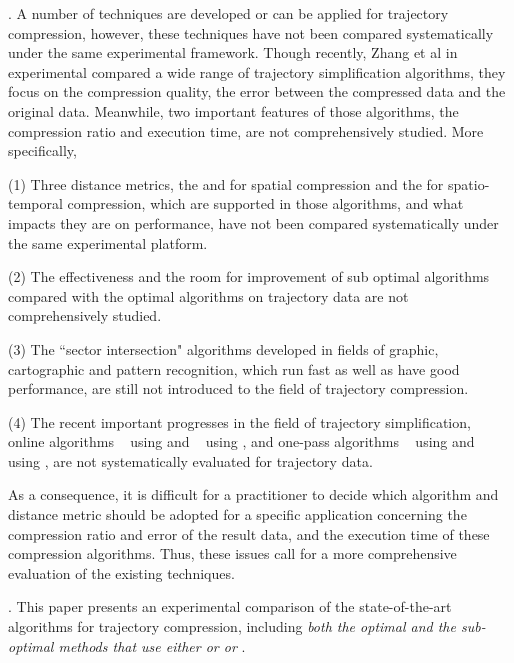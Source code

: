 . A number of techniques are developed or can be applied for trajectory compression, however, these techniques have not been compared systematically under the same experimental framework.
Though recently, Zhang et al in \cite{Zhang:Evaluation} experimental compared a wide range of trajectory simplification algorithms, they focus on the compression quality, \ie the error between the compressed data and the original data. Meanwhile, two important features of those algorithms, \ie the compression ratio and execution time, are not comprehensively studied. %
More specifically,

\ni (1) Three distance metrics, \ie the \ped and \dad for spatial compression and the \sed \cite{Meratnia:Spatiotemporal} for spatio-temporal compression, which are supported in those algorithms, and what impacts they are on performance, have not been compared systematically under the same experimental platform.

\ni (2) The effectiveness and the room for improvement of sub optimal \lsa algorithms compared with the optimal \lsa algorithms on trajectory data are not comprehensively studied.

\ni (3) The ``sector intersection" algorithms \cite{Williams:Longest, Sklansky:Cone, Dunham:Cone, Zhao:Sleeve} developed in fields of graphic, cartographic and pattern recognition, which run fast as well as have good performance, are still not introduced to the field of trajectory compression.

\ni (4) The recent important progresses in the field of trajectory simplification, \ie online algorithms \squishe~\cite{Muckell:Compression} using \sed and \bqsa~\cite{Liu:BQS} using \ped, and one-pass algorithms \operb~\cite{Lin:Operb} using \ped and \cised~\cite{Lin:Cised} using \sed, are not systematically evaluated for trajectory data.


As a consequence, it is difficult for a practitioner to decide which algorithm and distance metric should be adopted for a specific application concerning the compression ratio and error of the result data, and the execution time of these compression algorithms.
%
Thus, these issues call for a more comprehensive evaluation of the existing \lsa techniques. %

\stitle{\textcolor{blue}{Contributions}}.
This paper presents an experimental comparison of the state-of-the-art \lsa algorithms for trajectory compression, including \emph{both the optimal and the sub-optimal methods that use either \ped or \sed or \dad}.


